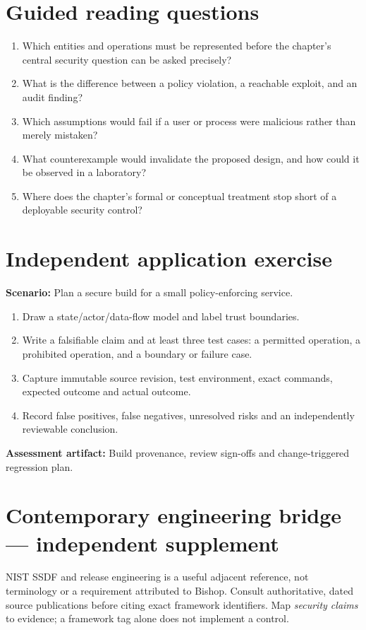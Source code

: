 \documentclass[10pt,letterpaper]{article}
\begin{document}
\section{Guided reading questions}
\begin{enumerate}
\item Which entities and operations must be represented before the chapter's central security question can be asked precisely?
\item What is the difference between a policy violation, a reachable exploit, and an audit finding?
\item Which assumptions would fail if a user or process were malicious rather than merely mistaken?
\item What counterexample would invalidate the proposed design, and how could it be observed in a laboratory?
\item Where does the chapter's formal or conceptual treatment stop short of a deployable security control?
\end{enumerate}
\section{Independent application exercise}
\textbf{Scenario:} Plan a secure build for a small policy-enforcing service.
\begin{enumerate}
\item Draw a state/actor/data-flow model and label trust boundaries.
\item Write a falsifiable claim and at least three test cases: a permitted operation, a prohibited operation, and a boundary or failure case.
\item Capture immutable source revision, test environment, exact commands, expected outcome and actual outcome.
\item Record false positives, false negatives, unresolved risks and an independently reviewable conclusion.
\end{enumerate}
\textbf{Assessment artifact:} Build provenance, review sign-offs and change-triggered regression plan.
\section{Contemporary engineering bridge --- independent supplement}
NIST SSDF and release engineering is a useful adjacent reference, not terminology or a requirement attributed to Bishop. Consult authoritative, dated source publications before citing exact framework identifiers. Map \emph{security claims} to evidence; a framework tag alone does not implement a control.
\end{document}
